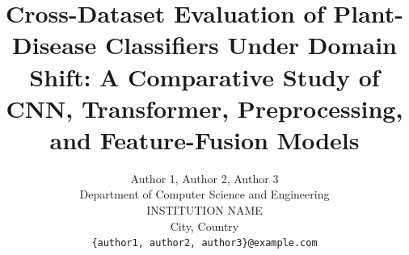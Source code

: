 \documentclass[10pt,journal,compsoc]{IEEEtran}
\begin{document}
\title{Cross-Dataset Evaluation of Plant-Disease Classifiers Under Domain Shift: A Comparative Study of CNN, Transformer, Preprocessing, and Feature-Fusion Models}

\author{
    Author 1, Author 2, Author 3\\
    Department of Computer Science and Engineering\\
    INSTITUTION NAME\\
    City, Country\\
    \texttt{\{author1, author2, author3\}@example.com}
}


\maketitle
\end{document}
